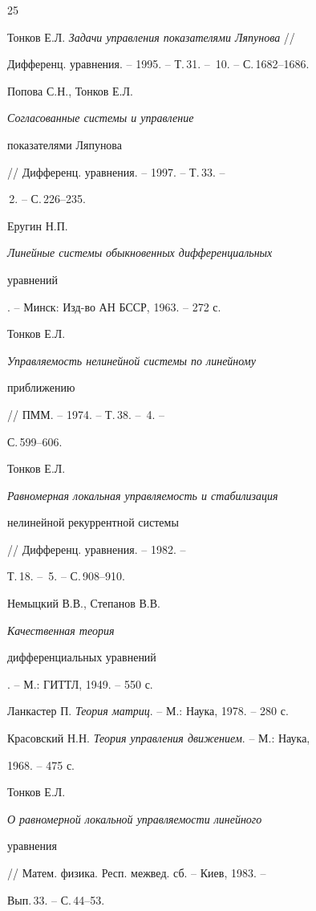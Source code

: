 \begin{thebibliography}{25}


Тонков Е.Л. {\em Задачи управления показателями Ляпунова} //


Дифференц. уравнения. -- 1995. -- Т.\,31. -- \No\,10. -- С.\,1682--1686.







Попова С.Н., Тонков Е.Л. {\em Согласованные системы и управление


показателями Ляпунова} // Дифференц. уравнения. -- 1997. -- Т.\,33. --


\No\,2. -- С.\,226--235.







Еругин Н.П. {\em Линейные системы обыкновенных дифференциальных


уравнений}. -- Минск: Изд-во АН БССР, 1963. -- 272 с.







Тонков Е.Л. {\em Управляемость нелинейной системы по линейному


приближению} // ПММ. -- 1974. -- Т.\,38. -- \No\,4. --


С.\,599--606.







Тонков Е.Л. {\em Равномерная локальная управляемость и стабилизация


нелинейной рекуррентной системы} // Дифференц.  уравнения. -- 1982. --


Т.\,18. -- \No\,5. -- С.\,908--910.







Немыцкий В.В., Степанов В.В. {\em Качественная теория


дифференциальных уравнений}. -- М.: ГИТТЛ, 1949. -- 550 с.







Ланкастер П. {\em Теория матриц}. -- М.: Наука, 1978. -- 280 с.







Красовский Н.Н. {\em Теория управления движением}. -- М.: Наука,


1968. -- 475 с.







Тонков Е.Л. {\em О равномерной локальной управляемости линейного


уравнения} // Матем. физика. Респ. межвед. сб. -- Киев, 1983. --


Вып.\,33. -- С.\,44--53.





\end{thebibliography}

